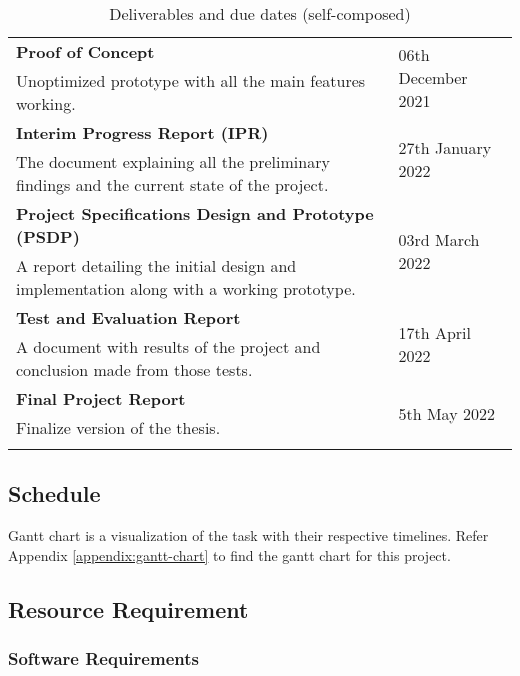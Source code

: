 \begin{longtable}{|p{115mm}|p{35mm}|}
\textbf{Proof of Concept} & \multirow{2}{*}{06th December 2021} \\
Unoptimized prototype with all the main features working. &  \\ \hline
\textbf{Interim Progress Report (IPR)} & \multirow{2}{*}{27th January 2022} \\
The document explaining all the preliminary findings and the current state of the project. &  \\ \hline
\textbf{Project Specifications Design and Prototype (PSDP)} & \multirow{2}{*}{03rd March 2022} \\ 
A report detailing the initial design and implementation along with a working prototype. &  \\ \hline
\textbf{Test and Evaluation Report} & \multirow{2}{*}{17th April 2022} \\
A document with results of the project and conclusion made from those tests. &  \\ \hline
\textbf{Final Project Report} & \multirow{2}{*}{5th May 2022} \\
Finalize version of the thesis. &  \\ \hline
\caption{Deliverables and due dates (self-composed)}
\end{longtable}

\subsection{Schedule}
Gantt chart is a visualization of the task with their respective timelines. Refer Appendix \ref{appendix:gantt-chart} to find the gantt chart for this project.



\subsection{Resource Requirement}

\subsubsection{Software Requirements}

